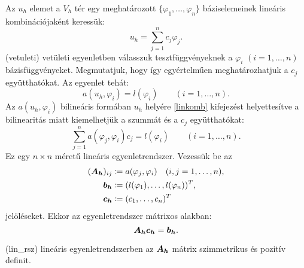 Az $u_h$ elemet a $V_h$ tér egy meghatározott $\{\varphi_1, \ldots, \varphi_n \}$ báziselemeinek lineáris kombinációjaként keressük:
\begin{equation}\label{linkomb}
		u_h = \sum_{j=1}^n c_j\varphi_j.
\end{equation}
\Aref({vetuleti}) vetületi egyenletben válasszuk tesztfüggvényeknek a $\varphi_i$ $(i = 1, \ldots , n) $ bázisfüggvényeket. Megmutatjuk, hogy így egyértelműen meghatározhatjuk a $c_j$ együtthatókat. Az egyenlet tehát:
\begin{equation*}
		a(u_h,\varphi_i) = l(\varphi_i) \qquad (i = 1, \ldots , n).
\end{equation*}
Az $a(u_h,\varphi_i)$ bilineáris formában $u_h$ helyére \eqref{linkomb} kifejezést helyettesítve a bilinearitás miatt kiemelhetjük a szummát és  a $c_j$ együtthatókat:
\begin{equation*}
		\sum_{j=1}^n a(\varphi_j,\varphi_i)c_j = l(\varphi_i) \qquad (i = 1, \ldots , n).
\end{equation*}
Ez egy  $n \times n$ méretű lineáris egyenletrendszer. Vezessük be az 
\begin{equation}\label{hom_matrixok}
	\begin{aligned}
		(\bm{A_h})_{ij} &\coloneqq a(\varphi_j,\varphi_i) \quad (i,j = 1, \ldots, n),\\ 
		\bm{b_h} &\coloneqq (l(\varphi_1),\ldots ,l(\varphi_n))^T, \\
		\bm{c_h} &\coloneqq (c_1, \ldots , c_n)^T
	\end{aligned}
\end{equation}
jelöléseket. Ekkor az egyenletrendszer mátrixos alakban:
\begin{equation}\label{lin_rsz}
	\bm{A_h}\bm{c_h} = \bm{b_h} .
\end{equation}

\begin{statement}\label{szimpoz}
	\Aref({lin_rsz}) lineáris egyenletrendszerben az $\bm{A_h}$ mátrix szimmetrikus és pozitív definit.
\end{statement}

